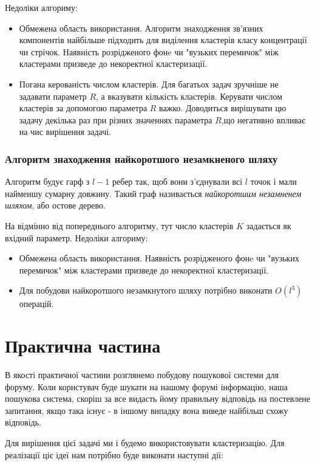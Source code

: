 \documentclass[a4paper,14pt,russian]{extreport}
\begin{document}
		Недоліки алгориму:
		\begin{itemize}
			
			\item Обмежена область використання. Алгоритм знаходження зв'язних компонентів найбільше підходить для виділення кластерів класу концентрації чи стрічок. Наявність розрідженого фонe чи "вузьких перемичок" між кластерами призведе до некоректної кластеризації. 
			
			\item Погана керованість числом кластерів. Для багатьох задач зручніше не задавати параметр $R$, а вказувати кількість кластерів. Керувати числом кластерів за допомогою параметра $R$ важко. Доводиться вирішувати цю задачу декілька раз при різних значеннях параметра $R$,що негативно впливає на чис вирішення задачі.
		
		\end{itemize}
		
		\subsection{Алгоритм знаходження найкоротшого незамкненого шляху}
		
		Алгоритм будує гарф з $l- 1$ ребер так, щоб вони з'єднували всі $l$ точок і мали найменшу сумарну довжину. Такий граф називається \textit{найкоротшим незамненем шляхом}, або остове дерево. \par 
		На відмінно від попереднього алгоритму, тут число кластерів $K$ задається як вхідний параметр. 
		Недоліки алгориму:
		\begin{itemize}
		
			\item 	Обмежена область використання.  Наявність розрідженого фонe чи "вузьких перемичок" між кластерами призведе до некоректної кластеризації. 
			
			\item Для побудови найкоротшого незамкнутого шляху потрібно виконати $O(l^3)$ операцій.
		
		
		\end{itemize}
		
		
	 
	 
\chapter{Практична частина}
В якості практичної частини розглянемо побудову пошукової системи для форуму. Коли користувач буде шукати на нашому форумі інформацію, наша пошукова система, скоріш за все видасть йому правильну відповідь на постевлене запитання, якщо така існує - в іншому випадку вона виведе найбільш схожу відповідь.\par 
Для вирішення цієї задачі ми і будемо використовувати кластеризацію. Для реалізації ціє ідеї нам потрібно буде виконати наступні дії:
\end{document}
